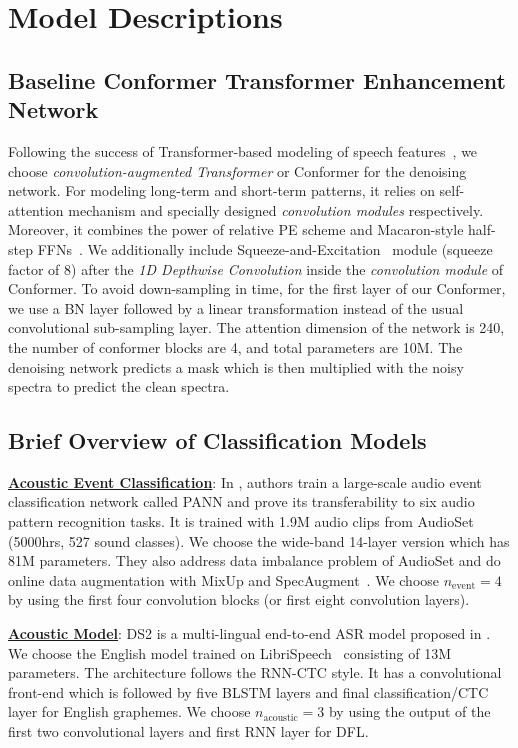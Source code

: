 \documentclass{article}
\begin{document}
\section{Model Descriptions}
\subsection{Baseline Conformer Transformer Enhancement Network}
Following the success of Transformer-based modeling of speech features~\cite{gulati2020conformer,kim2020t}, we choose \emph{convolution-augmented Transformer} or Conformer \cite{gulati2020conformer} for the denoising network.
For modeling long-term and short-term patterns, it relies on self-attention mechanism and specially designed \emph{convolution modules} respectively.
Moreover, it combines the power of relative \ac{PE} scheme and Macaron-style half-step \ac{FFNs}~\cite{gulati2020conformer}.
We additionally include Squeeze-and-Excitation~\cite{hu2018squeeze} module (squeeze factor of 8) after the \emph{1D Depthwise Convolution} inside the \emph{convolution module} of Conformer.
To avoid down-sampling in time, for the first layer of our Conformer, we use a \ac{BN} layer followed by a linear transformation instead of the usual convolutional sub-sampling layer.
The attention dimension of the network is 240, the number of conformer blocks are 4, and total parameters are 10M.
The denoising network predicts a mask which is then multiplied with the noisy spectra to predict the clean spectra.

\subsection{Brief Overview of Classification Models}
\underline{\textbf{Acoustic Event Classification}}: In \cite{kong2019panns}, authors train a large-scale audio event classification network called \ac{PANN} and prove its transferability to six audio pattern recognition tasks.
It is trained with 1.9M audio clips from AudioSet~\cite{gemmeke2017audio} (5000hrs, 527 sound classes).
We choose the wide-band 14-layer version
which has 81M parameters.
They also address data imbalance problem of AudioSet and do online data augmentation with MixUp and SpecAugment~\cite{park2019specaugment}.
We choose $n_\text{event}=4$ by using the first four convolution blocks (or first eight convolution layers).

\underline{\textbf{Acoustic Model}}: \ac{DS2} is a multi-lingual end-to-end \ac{ASR} model proposed in \cite{amodei2016deep}.
We choose the English model trained on LibriSpeech~\cite{panayotov2015librispeech}
consisting of 13M parameters.
The architecture follows the \ac{RNN}-\ac{CTC} style.
It has a convolutional front-end which is followed by five \ac{BLSTM} layers and final classification/CTC layer for English graphemes.
We choose $n_{\text{acoustic}}=3$ by using the output of the first two convolutional layers and first RNN layer for DFL.
\end{document}
